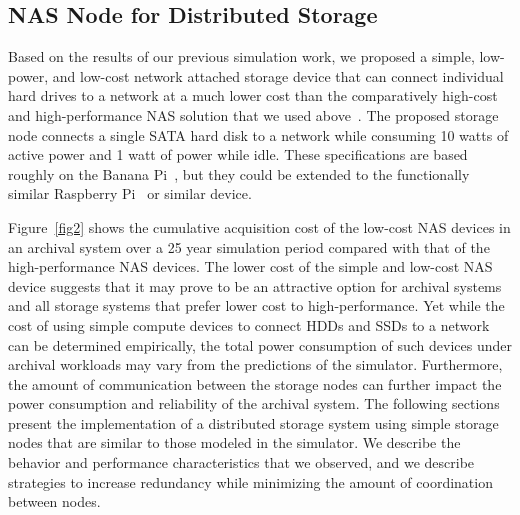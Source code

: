 \subsection{NAS Node for Distributed Storage}
Based on the results of our previous simulation work, we proposed a simple, low-power, and low-cost network attached storage device that can connect individual hard drives to a network at a much lower cost than the comparatively high-cost and high-performance NAS solution that we used above~\cite{web35}.  The proposed storage node connects a single SATA hard disk to a network while consuming 10 watts of active power and 1 watt of power while idle.  These specifications are based roughly on the Banana Pi~\cite{web40}, but they could be extended to the functionally similar Raspberry Pi~\cite{web49} or similar device.

Figure~\ref{fig2} shows the cumulative acquisition cost of the low-cost NAS devices in an archival system over a 25 year simulation period compared with that of the high-performance NAS devices.  The lower cost of the simple and low-cost NAS device suggests that it may prove to be an attractive option for archival systems and all storage systems that prefer lower cost to high-performance.  Yet while the cost of using simple compute devices to connect HDDs and SSDs to a network can be determined empirically, the total power consumption of such devices under archival workloads may vary from the predictions of the simulator.  Furthermore, the amount of communication between the storage nodes can further impact the power consumption and reliability of the archival system.  The following sections present the implementation of a distributed storage system using simple storage nodes that are similar to those modeled in the simulator.  We describe the behavior and performance characteristics that we observed, and we describe strategies to increase redundancy while minimizing the amount of coordination between nodes.

